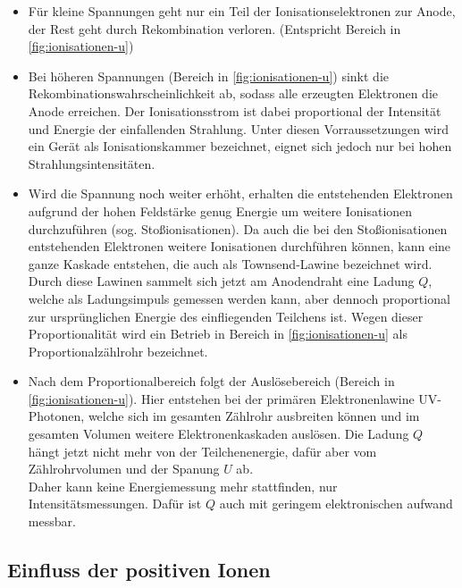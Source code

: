 \begin{itemize}
	\item Für kleine Spannungen geht nur ein Teil der Ionisationselektronen zur Anode, der Rest geht 
		durch Rekombination verloren. (Entspricht Bereich  in \autoref{fig:ionisationen-u})
	\item Bei höheren Spannungen (Bereich  in \autoref{fig:ionisationen-u})
		sinkt die Rekombinationswahrscheinlichkeit ab, sodass alle erzeugten Elektronen
		die Anode erreichen. Der Ionisationsstrom ist dabei proportional der Intensität und Energie
		der einfallenden Strahlung. Unter diesen Vorraussetzungen wird ein Gerät als Ionisationskammer
		bezeichnet, eignet sich jedoch nur bei hohen Strahlungsintensitäten.
	\item Wird die Spannung noch weiter erhöht, erhalten die entstehenden Elektronen aufgrund der hohen Feldstärke
		genug Energie um weitere Ionisationen durchzuführen (sog. Stoßionisationen). Da auch die bei den
		Stoßionisationen entstehenden Elektronen weitere Ionisationen durchführen können, kann eine ganze
		Kaskade entstehen, die auch als Townsend-Lawine bezeichnet wird.
		\\
		Durch diese Lawinen sammelt sich jetzt am Anodendraht eine Ladung $Q$, welche als Ladungsimpuls 
		gemessen werden kann, aber dennoch proportional zur ursprünglichen Energie des einfliegenden
		Teilchens ist. Wegen dieser Proportionalität wird ein Betrieb in Bereich  in 
		\autoref{fig:ionisationen-u} als Proportionalzählrohr bezeichnet.
	\item Nach dem Proportionalbereich folgt der Auslösebereich (Bereich  in
		\autoref{fig:ionisationen-u}). Hier entstehen bei der primären Elektronenlawine UV-Photonen, welche
		sich im gesamten Zählrohr ausbreiten können und im gesamten Volumen weitere Elektronenkaskaden auslösen.
		Die Ladung $Q$ hängt jetzt nicht mehr von der Teilchenenergie, dafür aber vom Zählrohrvolumen und der 
		Spanung $U$ ab.
		\\
		Daher kann keine Energiemessung mehr stattfinden, nur Intensitätsmessungen. Dafür ist $Q$ auch mit
		geringem elektronischen aufwand messbar.
\end{itemize}



\subsection{Einfluss der positiven Ionen}
\label{sec:einfluss-ionen}
